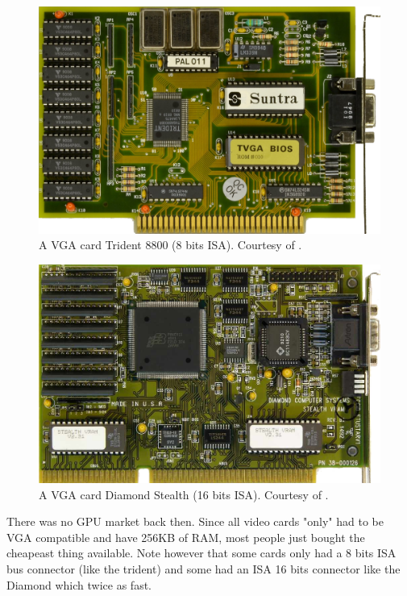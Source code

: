 \documentclass[book.tex]{subfiles}
\begin{document}
\begin{figure}[H] 
  \centering \includegraphics[width=\textwidth]{screenshots/hardware/suntra_trident_tvga8800br.png} 
  \caption{A VGA card Trident 8800 (8 bits ISA). Courtesy of .}
\end{figure}
\par
\begin{figure}[H] 
  \centering 
  \includegraphics[width=\textwidth]{screenshots/hardware/diamond_stealth_vram_revb2.png} 
  \caption{A VGA card Diamond Stealth (16 bits ISA). Courtesy of .}
\end{figure}
 There was no GPU market back then. Since all video cards "only" had to be VGA compatible and have 256KB of RAM, most people just bought the cheapeast thing available. Note however that some cards only had a 8 bits ISA bus connector (like the trident) and some had an ISA 16 bits connector like the Diamond which twice as fast.\\
\par
\end{document}
